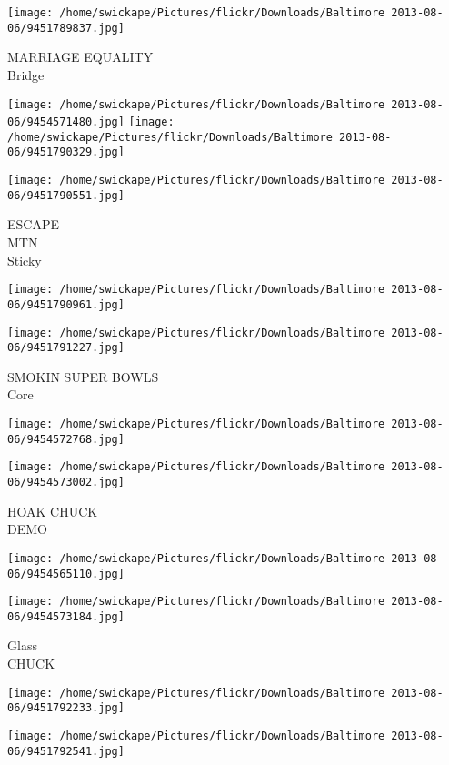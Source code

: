 \documentclass[10pt,letterpaper]{article}
\begin{document}
\vspace{0.25in}
\texttt{[image: /home/swickape/Pictures/flickr/Downloads/Baltimore 2013-08-06/9451789837.jpg]}

MARRIAGE EQUALITY\\
Bridge
\pagebreak

\texttt{[image: /home/swickape/Pictures/flickr/Downloads/Baltimore 2013-08-06/9454571480.jpg]}
\texttt{[image: /home/swickape/Pictures/flickr/Downloads/Baltimore 2013-08-06/9451790329.jpg]}

\vspace{0.25in}
\texttt{[image: /home/swickape/Pictures/flickr/Downloads/Baltimore 2013-08-06/9451790551.jpg]}

ESCAPE\\
MTN\\
Sticky
\pagebreak

\texttt{[image: /home/swickape/Pictures/flickr/Downloads/Baltimore 2013-08-06/9451790961.jpg]}

\vspace{0.25in}
\texttt{[image: /home/swickape/Pictures/flickr/Downloads/Baltimore 2013-08-06/9451791227.jpg]}

SMOKIN SUPER BOWLS\\
Core
\pagebreak

\texttt{[image: /home/swickape/Pictures/flickr/Downloads/Baltimore 2013-08-06/9454572768.jpg]}

\vspace{0.25in}
\texttt{[image: /home/swickape/Pictures/flickr/Downloads/Baltimore 2013-08-06/9454573002.jpg]}

HOAK CHUCK\\
DEMO
\pagebreak

\texttt{[image: /home/swickape/Pictures/flickr/Downloads/Baltimore 2013-08-06/9454565110.jpg]}

\vspace{0.25in}
\texttt{[image: /home/swickape/Pictures/flickr/Downloads/Baltimore 2013-08-06/9454573184.jpg]}

Glass\\
CHUCK
\pagebreak

\texttt{[image: /home/swickape/Pictures/flickr/Downloads/Baltimore 2013-08-06/9451792233.jpg]}

\vspace{0.25in}
\texttt{[image: /home/swickape/Pictures/flickr/Downloads/Baltimore 2013-08-06/9451792541.jpg]}
\end{document}
